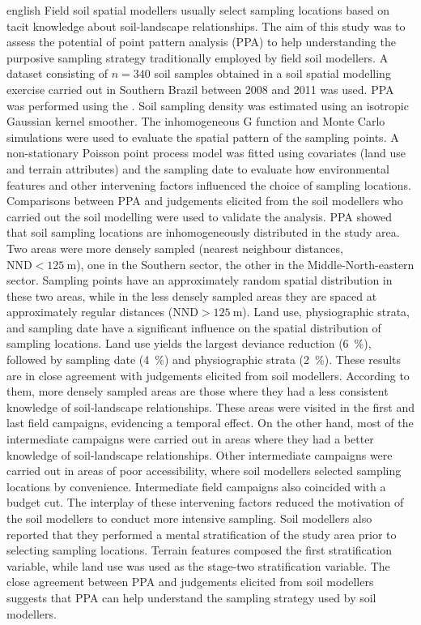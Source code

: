 \begin{chapterabstract}{english}{\enkeys}
Field soil spatial modellers usually select sampling locations based on tacit knowledge about soil-landscape 
relationships. The aim of this study was to assess the potential of point pattern analysis (PPA) to help 
understanding the purposive sampling strategy traditionally employed by field soil modellers. A dataset 
consisting of $n = 340$ soil samples obtained in a soil spatial modelling exercise carried out in Southern 
Brazil between \num{2008} and \num{2011} was used. PPA was performed using the 
. Soil sampling density was estimated using an isotropic Gaussian kernel smoother. The 
inhomogeneous G function and Monte Carlo simulations were used to evaluate the spatial pattern of the sampling 
points. A non-stationary Poisson point process model was fitted using covariates (land use and terrain 
attributes) and the sampling date to evaluate how environmental features and other intervening factors 
influenced the choice of sampling locations. Comparisons between PPA and judgements elicited from the 
soil modellers who carried out the soil modelling were used to validate the analysis. PPA showed that soil 
sampling locations are inhomogeneously distributed in the study area. Two areas were more densely sampled 
(nearest neighbour distances, $\text{NND} < \SI{125}{\m}$), one in the Southern sector, the other in the 
Middle-North-eastern sector. Sampling points have an approximately random spatial distribution in these two 
areas, while in the less densely sampled areas they are spaced at approximately regular distances ($\text{NND} 
> \SI{125}{\m}$). Land use, physiographic strata, and sampling date have a significant influence on the spatial
distribution of sampling locations. Land use yields the largest deviance reduction (\SI{6}{\percent}), followed
by sampling date (\SI{4}{\percent}) and physiographic strata (\SI{2}{\percent}). These results are in close 
agreement with judgements elicited from soil modellers. According to them, more densely sampled areas are 
those where they had a less consistent knowledge of soil-landscape relationships. These areas were visited in 
the first and last field campaigns, evidencing a temporal effect. On the other hand, most of the intermediate 
campaigns were carried out in areas where they had a better knowledge of soil-landscape relationships. Other 
intermediate campaigns were carried out in areas of poor accessibility, where soil modellers selected sampling 
locations by convenience. Intermediate field campaigns also coincided with a budget cut. The interplay of 
these intervening factors reduced the motivation of the soil modellers to conduct more intensive sampling. 
Soil modellers also reported that they performed a mental stratification of the study area prior to selecting 
sampling locations. Terrain features composed the first stratification variable, while land use was used as 
the stage-two stratification variable. The close agreement between PPA and judgements elicited from soil 
modellers suggests that PPA can help understand the sampling strategy used by soil modellers.
\end{chapterabstract}


